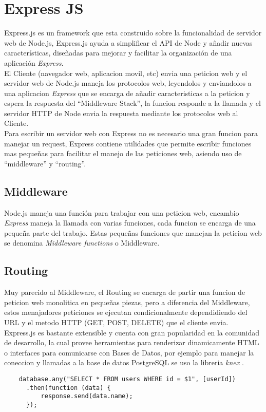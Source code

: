 \section{Express JS}
\label{sec:express_js}
  Express.js es un framework que esta construido sobre la funcionalidad de servidor web de Node.js, Express.js ayuda a simplificar el API de Node y a\~nadir nuevas caracter\'isticas, dise\~nadas para mejorar y facilitar la organizaci\'on de una aplicaci\'on \emph{Express}.\\

  El Cliente (navegador web, aplicacion movil, etc) envia una peticion web y el servidor web de Node.js maneja los protocolos web, leyendolos y enviandolos a una aplicacion \emph{Express} que se encarga de a\~nadir caracteristicas a la peticion y espera la respuesta del ``Middleware Stack'', la funcion responde a la llamada y el servidor HTTP de Node envia la respuesta mediante los protocolos web al Cliente.\\

  Para escribir un servidor web con Express no es necesario una gran funcion para manejar un request, Express contiene utilidades que permite escribir funciones mas peque\~nas para facilitar el manejo de las peticiones web, asiendo uso de ``middleware'' y ``routing''.

  \subsection{Middleware}
  \label{sub:middleware}
    Node.js maneja una funci\'on para trabajar con una peticion web, encambio \emph{Express} maneja la llamada con varias funciones, cada funcion se encarga de una peque\~na parte del trabajo. Estas peque\~nas funciones que manejan la peticion web se denomina \emph{Middleware functions} o Middleware.


  \subsection{Routing}
  \label{sub:routing}
    Muy parecido al Middleware, el Routing se encarga de partir una funcion de peticion web monolitica en peque\~nas piezas, pero a diferencia del Middleware, estos menajadores peticiones se ejecutan condicionalmente dependidiendo del URL y el metodo HTTP (GET, POST, DELETE) que el cliente envia.\\


  Express.js es bastante extensible y cuenta con gran popularidad en la comunidad de desarrollo, la cual provee herramientas para renderizar dinamicamente HTML o interfaces para comunicarse con Bases de Datos, por ejemplo para manejar la coneccion y llamadas a la base de datos PostgreSQL se uso la libreria \emph{knex} .

  \begin{verbatim}
    database.any("SELECT * FROM users WHERE id = $1", [userId])
      .then(function (data) {
          response.send(data.name);
      });
  \end{verbatim}

